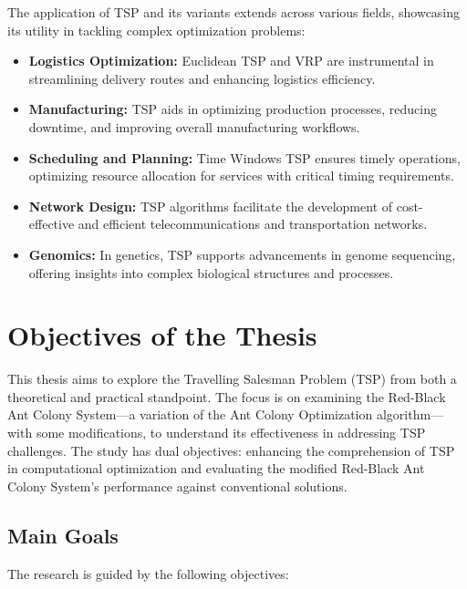 The application of TSP and its variants extends across various fields, showcasing its utility in tackling complex optimization problems:

\begin{itemize}
	\item \textbf{Logistics Optimization:} Euclidean TSP and VRP are instrumental in streamlining delivery routes and enhancing logistics efficiency.
	\item \textbf{Manufacturing:} TSP aids in optimizing production processes, reducing downtime, and improving overall manufacturing workflows.
	\item \textbf{Scheduling and Planning:} Time Windows TSP ensures timely operations, optimizing resource allocation for services with critical timing requirements.
	\item \textbf{Network Design:} TSP algorithms facilitate the development of cost-effective and efficient telecommunications and transportation networks.
	\item \textbf{Genomics:} In genetics, TSP supports advancements in genome sequencing, offering insights into complex biological structures and processes.
\end{itemize}
\section{Objectives of the Thesis}

This thesis aims to explore the Travelling Salesman Problem (TSP) from both a theoretical and practical standpoint. The focus is on examining the Red-Black Ant Colony System—a variation of the Ant Colony Optimization algorithm—with some modifications, to understand its effectiveness in addressing TSP challenges. The study has dual objectives: enhancing the comprehension of TSP in computational optimization and evaluating the modified Red-Black Ant Colony System's performance against conventional solutions.

\subsection{Main Goals}

The research is guided by the following objectives:

